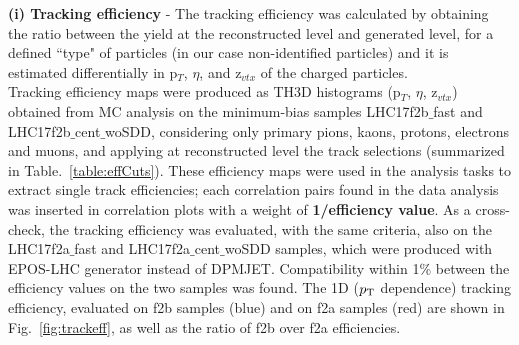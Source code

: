 {\bf \normalsize (i) Tracking efficiency} - The tracking efficiency was calculated by obtaining the ratio between the yield at the reconstructed level and generated level, for a defined ``type" of particles (in our case non-identified particles) and it is estimated differentially in p$_T$, $\eta$, and z$_{vtx}$ of the charged particles.\\

Tracking efficiency maps were produced as TH3D histograms (p$_T$, $\eta$, z$_{vtx}$) obtained from MC analysis on the minimum-bias samples LHC17f2b$\_$fast and LHC17f2b$\_$cent$\_$woSDD, considering only primary pions, kaons, protons, electrons and muons, and applying at reconstructed level the track selections (summarized in Table.~\ref{table:effCuts}). These efficiency maps were used in the analysis tasks to extract single track efficiencies; each correlation pairs found in the data analysis was inserted in correlation plots with a weight of {\bf 1/efficiency value}. 
As a cross-check, the tracking efficiency was evaluated, with the same criteria, also on the LHC17f2a$\_$fast and LHC17f2a$\_$cent$\_$woSDD samples, which were produced with EPOS-LHC generator instead of DPMJET. Compatibility within 1\% between the efficiency values on the two samples was found.
The 1D ($p_{\rm T}$ dependence) tracking efficiency, evaluated on f2b samples (blue) and on f2a samples (red) are shown in Fig.~\ref{fig:trackeff}, as well as the ratio of f2b over f2a efficiencies.

